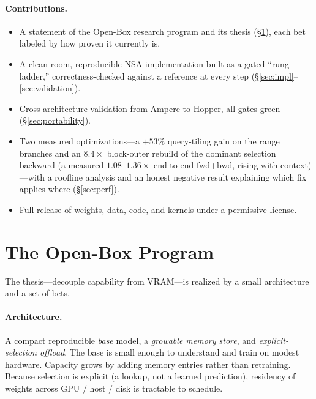 \documentclass[11pt]{article}
\begin{document}
\paragraph{Contributions.}
\begin{itemize}[leftmargin=1.2em,itemsep=2pt]
\item A statement of the Open-Box research program and its thesis (\S\ref{sec:program}), each bet
labeled by how proven it currently is.
\item A clean-room, reproducible NSA implementation built as a gated ``rung ladder,''
correctness-checked against a reference at every step (\S\ref{sec:impl}--\ref{sec:validation}).
\item Cross-architecture validation from Ampere to Hopper, all gates green (\S\ref{sec:portability}).
\item Two measured optimizations---a $+53\%$ query-tiling gain on the range branches and an
$8.4\times$ block-outer rebuild of the dominant selection backward (a measured $1.08$--$1.36\times$
end-to-end fwd+bwd, rising with context)---with a roofline analysis and an honest negative result
explaining which fix applies where (\S\ref{sec:perf}).
\item Full release of weights, data, code, and kernels under a permissive license.
\end{itemize}

\section{The Open-Box Program}
\label{sec:program}
The thesis---decouple capability from VRAM---is realized by a small architecture and a set of bets.

\paragraph{Architecture.} A compact reproducible \emph{base} model, a \emph{growable memory store},
and \emph{explicit-selection offload}. The base is small enough to understand and train on modest
hardware. Capacity grows by adding memory entries rather than retraining. Because selection is
explicit (a lookup, not a learned prediction), residency of weights across GPU / host / disk is
tractable to schedule.
\end{document}
